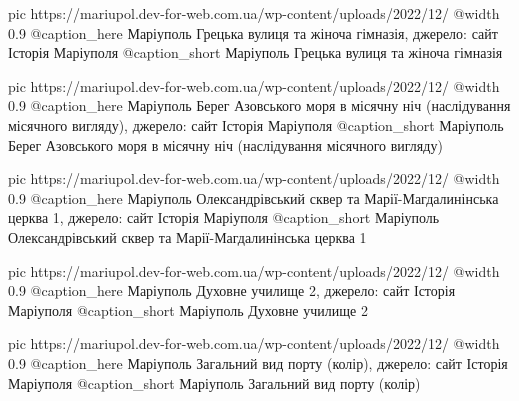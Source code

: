 	pic https://mariupol.dev-for-web.com.ua/wp-content/uploads/2022/12/%
	@width 0.9
	@caption_here Маріуполь Грецька вулиця та жіноча гімназія, джерело: сайт Історія Маріуполя
	@caption_short Маріуполь Грецька вулиця та жіноча гімназія

	pic https://mariupol.dev-for-web.com.ua/wp-content/uploads/2022/12/%
	@width 0.9
	@caption_here Маріуполь Берег Азовського моря в місячну ніч (наслідування місячного вигляду), джерело: сайт Історія Маріуполя
	@caption_short Маріуполь Берег Азовського моря в місячну ніч (наслідування місячного вигляду)

	pic https://mariupol.dev-for-web.com.ua/wp-content/uploads/2022/12/%
	@width 0.9
	@caption_here Маріуполь Олександрівський сквер та Марії-Магдалинінська церква 1, джерело: сайт Історія Маріуполя
	@caption_short Маріуполь Олександрівський сквер та Марії-Магдалинінська церква 1

	pic https://mariupol.dev-for-web.com.ua/wp-content/uploads/2022/12/%
	@width 0.9
	@caption_here Маріуполь Духовне училище 2, джерело: сайт Історія Маріуполя
	@caption_short Маріуполь Духовне училище 2

	pic https://mariupol.dev-for-web.com.ua/wp-content/uploads/2022/12/%
	@width 0.9
	@caption_here Маріуполь Загальний вид порту (колір), джерело: сайт Історія Маріуполя
	@caption_short Маріуполь Загальний вид порту (колір)

